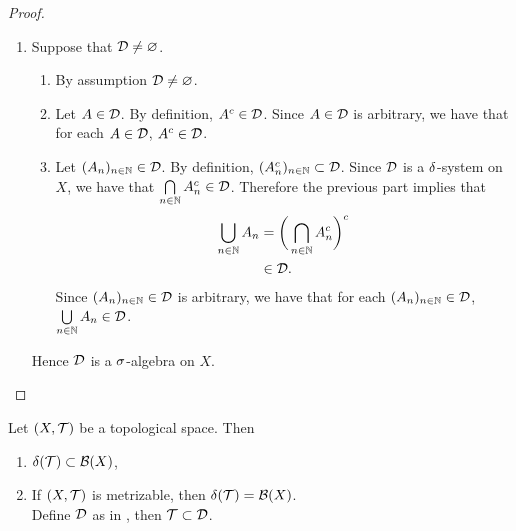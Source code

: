 \documentclass{book}
\begin{document}
\begin{proof}
\begin{enumerate}
\begin{enumerate}
\begin{itemize}
					\begin{align*}
						\bigg( \bigcup_{n \in \N} A_n \bigg)^c 
						& = \bigcap_{n \in \N} A_n^c \\
						& \in \del(\MT).
					\end{align*}
				\end{itemize}
				Since $\bigcup\limits_{n \in \N} A_n \in \del(\MT)$ and $\bigg( \bigcup\limits_{n \in \N} A_n \bigg)^c \in \del(\MT)$, we have that $\bigcup\limits_{n \in \N} A_n \in \MD$. 
			\end{enumerate}
			Thus $\MD$ is a $\del$-system on $X$.
			\item Suppose that $\mathcal{D} \neq \varnothing$.
			\begin{enumerate}
				\item By assumption $\mathcal{D} \neq \varnothing$.
				\item Let $A \in \mathcal{D}$. By definition, $A^c \in \mathcal{D}$. Since $A \in \mathcal{D}$ is arbitrary, we have that for each $A \in \mathcal{D}$, $A^c \in \mathcal{D}$.
				\item Let $(A_n)_{n \in \mathbb{N}} \in \mathcal{D}$. By definition, $(A_n^c)_{n \in \mathbb{N}} \subset \mathcal{D}$. Since $\MD$ is a $\del$-system on $X$, we have that $\bigcap\limits_{n \in \mathbb{N}} A_n^c \in \mathcal{D}$. Therefore the previous part implies that
				\begin{align*}
					\bigcup_{n \in \mathbb{N}} A_n
					& = \bigg( \bigcap_{n \in \mathbb{N}} A_n^c \bigg)^c \\
					& \in \mathcal{D}. 
				\end{align*}
				Since $(A_n)_{n \in \mathbb{N}} \in \mathcal{D}$ is arbitrary, we have that for each $(A_n)_{n \in \mathbb{N}} \in \mathcal{D}$, $\bigcup\limits_{n \in \N} A_n \in \MD$. 
			\end{enumerate}
			Hence $\MD$ is a $\sigma$-algebra on $X$. 
		\end{enumerate}
	\end{proof}
	
	\begin{ex} 
		Let $(X, \mathcal{T})$ be a topological space. Then 
		\begin{enumerate}
			\item $\delta(\mathcal{T}) \subset \mathcal{B}(X)$,
			\item If $(X, \mathcal{T})$ is metrizable, then $\delta(\mathcal{T}) = \mathcal{B}(X)$.  \\
			 Define $\MD$ as in , then $\mathcal{T} \subset \mathcal{D}$.
		\end{enumerate}
	\end{ex}
\end{document}
